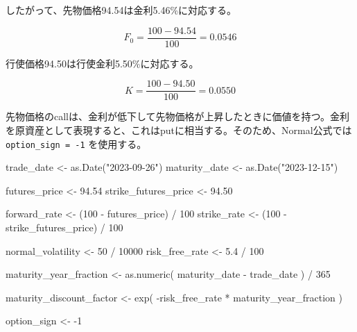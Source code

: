 \documentclass[
  letterpaper,
  DIV=11,
  numbers=noendperiod]{scrreprt}
\newenvironment{Shaded}{\begin{snugshade}}{\end{snugshade}}
\newcommand{\DecValTok}[1]{\textcolor[rgb]{0.68,0.00,0.00}{#1}}
\newcommand{\FloatTok}[1]{\textcolor[rgb]{0.68,0.00,0.00}{#1}}
\newcommand{\FunctionTok}[1]{\textcolor[rgb]{0.28,0.35,0.67}{#1}}
\newcommand{\NormalTok}[1]{\textcolor[rgb]{0.00,0.23,0.31}{#1}}
\newcommand{\OtherTok}[1]{\textcolor[rgb]{0.00,0.23,0.31}{#1}}
\newcommand{\SpecialCharTok}[1]{\textcolor[rgb]{0.37,0.37,0.37}{#1}}
\newcommand{\StringTok}[1]{\textcolor[rgb]{0.13,0.47,0.30}{#1}}
\begin{document}
したがって、先物価格94.54は金利5.46\%に対応する。

\[
F_0
=
\frac{100-94.54}{100}
=
0.0546
\]

行使価格94.50は行使金利5.50\%に対応する。

\[
K
=
\frac{100-94.50}{100}
=
0.0550
\]

先物価格のcallは、金利が低下して先物価格が上昇したときに価値を持つ。金利を原資産として表現すると、これはputに相当する。そのため、Normal公式では
\texttt{option\_sign\ =\ -1} を使用する。

\begin{Shaded}
\begin{Highlighting}[]
\NormalTok{trade\_date }\OtherTok{\textless{}{-}} \FunctionTok{as.Date}\NormalTok{(}\StringTok{"2023{-}09{-}26"}\NormalTok{)}
\NormalTok{maturity\_date }\OtherTok{\textless{}{-}} \FunctionTok{as.Date}\NormalTok{(}\StringTok{"2023{-}12{-}15"}\NormalTok{)}

\NormalTok{futures\_price }\OtherTok{\textless{}{-}} \FloatTok{94.54}
\NormalTok{strike\_futures\_price }\OtherTok{\textless{}{-}} \FloatTok{94.50}

\NormalTok{forward\_rate }\OtherTok{\textless{}{-}}\NormalTok{ (}\DecValTok{100} \SpecialCharTok{{-}}\NormalTok{ futures\_price) }\SpecialCharTok{/} \DecValTok{100}
\NormalTok{strike\_rate }\OtherTok{\textless{}{-}}\NormalTok{ (}\DecValTok{100} \SpecialCharTok{{-}}\NormalTok{ strike\_futures\_price) }\SpecialCharTok{/} \DecValTok{100}

\NormalTok{normal\_volatility }\OtherTok{\textless{}{-}} \DecValTok{50} \SpecialCharTok{/} \DecValTok{10000}
\NormalTok{risk\_free\_rate }\OtherTok{\textless{}{-}} \FloatTok{5.4} \SpecialCharTok{/} \DecValTok{100}

\NormalTok{maturity\_year\_fraction }\OtherTok{\textless{}{-}} \FunctionTok{as.numeric}\NormalTok{(}
\NormalTok{  maturity\_date }\SpecialCharTok{{-}}\NormalTok{ trade\_date}
\NormalTok{) }\SpecialCharTok{/} \DecValTok{365}

\NormalTok{maturity\_discount\_factor }\OtherTok{\textless{}{-}} \FunctionTok{exp}\NormalTok{(}
  \SpecialCharTok{{-}}\NormalTok{risk\_free\_rate }\SpecialCharTok{*}\NormalTok{ maturity\_year\_fraction}
\NormalTok{)}

\NormalTok{option\_sign }\OtherTok{\textless{}{-}} \SpecialCharTok{{-}}\DecValTok{1}


\end{Highlighting}
\end{Shaded}
\end{document}
